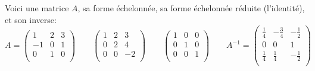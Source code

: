\documentclass[class=report,crop=false]{standalone}
\begin{document}
Voici une matrice $A$, sa forme échelonnée, sa forme échelonnée réduite (l'identité), et son inverse:
$$
A = \begin{pmatrix}
1  &  2  &  3\\
-1  &  0  &  1\\
0  &  1  &  0\\
\end{pmatrix}\qquad
\begin{pmatrix}
1  &  2  &  3\\
0  &  2  &  4\\
0  &  0 & -2\\
\end{pmatrix}\qquad
\begin{pmatrix}
1 & 0 & 0\\
0 & 1 & 0\\
0 & 0 & 1\\
\end{pmatrix}\qquad
A^{-1} = \begin{pmatrix}
\frac14 & -\frac34 & -\frac12\\
0  &  0  &  1\\
\frac14  & \frac14 & -\frac12\\ 
\end{pmatrix}$$
\end{document}
